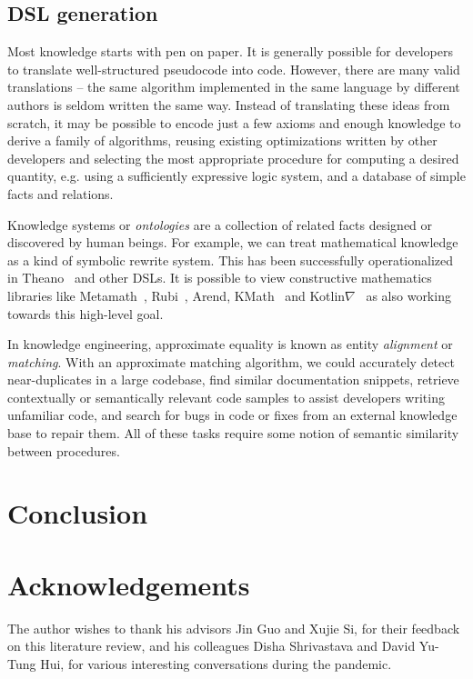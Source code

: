 \documentclass[10pt]{article}
\begin{document}
  \subsection{DSL generation}\label{subsec:gen}

Most knowledge starts with pen on paper. It is generally possible for developers to translate well-structured pseudocode into code. However, there are many valid translations -- the same algorithm implemented in the same language by different authors is seldom written the same way. Instead of translating these ideas from scratch, it may be possible to encode just a few axioms and enough knowledge to derive a family of algorithms, reusing existing optimizations written by other developers and selecting the most appropriate procedure for computing a desired quantity, e.g. using a sufficiently expressive logic system, and a database of simple facts and relations.

Knowledge systems or \textit{ontologies} are a collection of related facts designed or discovered by human beings. For example, we can treat mathematical knowledge as a kind of symbolic rewrite system. This has been successfully operationalized in Theano~\cite{bergstra2010theano} and other DSLs. It is possible to view constructive mathematics libraries like Metamath~\cite{megill2006metamath}, Rubi~\cite{rich2009knowledge}, Arend, KMath~\cite{nozik2019kotlin} and Kotlin$\nabla$~\cite{considine2019kotlingrad} as also working towards this high-level goal.

In knowledge engineering, approximate equality is known as entity \textit{alignment} or \textit{matching}. With an approximate matching algorithm, we could accurately detect near-duplicates in a large codebase, find similar documentation snippets, retrieve contextually or semantically relevant code samples to assist developers writing unfamiliar code, and search for bugs in code or fixes from an external knowledge base to repair them. All of these tasks require some notion of semantic similarity between procedures.

  \section{Conclusion}

  \pagebreak \section{Acknowledgements}

The author wishes to thank his advisors Jin Guo and Xujie Si, for their feedback on this literature review, and his colleagues Disha Shrivastava and David Yu-Tung Hui, for various interesting conversations during the pandemic.

  
  
\end{document}
